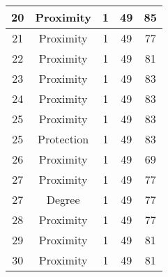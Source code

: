 \documentclass[results.tex]{subfiles}
\begin{document}
\begin{center}
\begin{tabular}{| c || c | c | c | c |}
            \hline
            20                      & Proximity                    & 1                      & 49                      & 85                   \\
            \hline
            21                      & Proximity                    & 1                      & 49                      & 77                   \\
            \hline
            22                      & Proximity                    & 1                      & 49                      & 81                   \\
            \hline
            23                      & Proximity                    & 1                      & 49                      & 83                   \\
            \hline
            24                      & Proximity                    & 1                      & 49                      & 83                   \\
            \hline
            25                      & Proximity                    & 1                      & 49                      & 83                   \\
            \hline
            25                      & Protection                   & 1                      & 49                      & 83                   \\
            \hline
            26                      & Proximity                    & 1                      & 49                      & 69                   \\
            \hline
            27                      & Proximity                    & 1                      & 49                      & 77                   \\
            \hline
            27                      & Degree                       & 1                      & 49                      & 77                   \\
            \hline
            28                      & Proximity                    & 1                      & 49                      & 77                   \\
            \hline
            29                      & Proximity                    & 1                      & 49                      & 81                   \\
            \hline
            30                      & Proximity                    & 1                      & 49                      & 81                   \\

\end{tabular}
\end{center}
\end{document}
